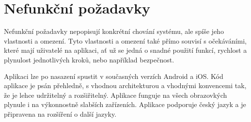 \section{Nefunkční požadavky}

Nefunkční požadavky nepopisují konkrétní chování systému,
ale spíše jeho vlastnosti a omezení.
Tyto vlastnosti a omezení také přímo souvisí s očekáváními,
které mají uživatelé na aplikaci,
ať už se jedná o snadné použití funkcí,
rychlost a plynulost jednotlivých kroků,
nebo například bezpečnost.~\cite{fr_nfr}

\begin{enumerate}[label=\textbf{N\arabic*}, ref=N\arabic*]
Aplikaci lze po nasazení spustit v současných verzích Android a iOS.
Kód aplikace je psán přehledně,
s vhodnou architekturou a vhodnými konvencemi tak,
že je lehce udržitelný a rozšiřitelný.
Aplikace funguje na všech obrazovkých plynule
i na výkonnostně slabších zařízeních.
Aplikace podporuje český jazyk
a je připravena na rozšíření o další jazyky.
\end{enumerate}
